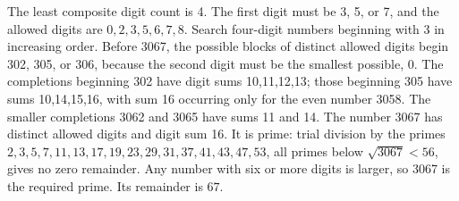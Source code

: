 The least composite digit count is 4. The first digit must be 3, 5, or 7, and the allowed digits are $0,2,3,5,6,7,8$. Search four-digit numbers beginning with 3 in increasing order. Before 3067, the possible blocks of distinct allowed digits begin 302, 305, or 306, because the second digit must be the smallest possible, 0. The completions beginning 302 have digit sums 10,11,12,13; those beginning 305 have sums 10,14,15,16, with sum 16 occurring only for the even number 3058. The smaller completions 3062 and 3065 have sums 11 and 14. The number 3067 has distinct allowed digits and digit sum 16. It is prime: trial division by the primes $2,3,5,7,11,13,17,19,23,29,31,37,41,43,47,53$, all primes below $\sqrt{3067}<56$, gives no zero remainder. Any number with six or more digits is larger, so 3067 is the required prime. Its remainder is $\boxed{67}$.

